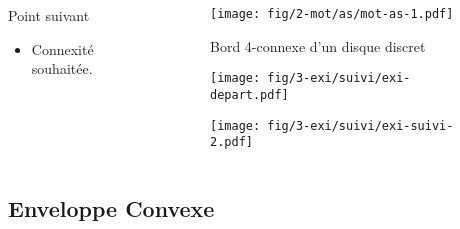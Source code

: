 \begin{frame}
\begin{columns}[t]
\begin{column}{0.6\linewidth}
{\begin{block}{Point suivant}
\begin{itemize}
          \item Connexité souhaitée.
        \end{itemize}
      \end{block} 
    }
  \end{column}
  \begin{column}{0.4\linewidth}
    {
      \begin{figure}[h!]
        \centering
        \texttt{[image: fig/2-mot/as/mot-as-1.pdf]}
        \caption{Bord 4-connexe d'un disque discret}
      \end{figure}    
    }
    {
      \begin{figure}[h!]
        \centering
        \texttt{[image: fig/3-exi/suivi/exi-depart.pdf]}
      \end{figure}    
    }
    {  
      \begin{figure}[h!]
        \centering
        \texttt{[image: fig/3-exi/suivi/exi-suivi-2.pdf]}
      \end{figure}  
    }
  \end{column}
\end{columns}





\end{frame}

\subsection{Enveloppe Convexe}

